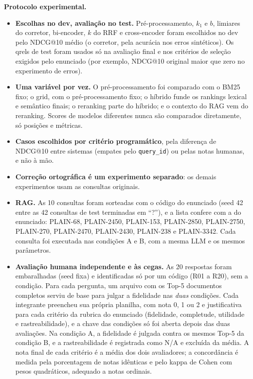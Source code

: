 \documentclass[10pt,a4paper]{article}
\newcommand{\pq}[1]{\mbox{PLAIN-#1}}        %
\begin{document}
\textbf{Protocolo experimental.}
\begin{itemize}
\item \textbf{Escolhas no dev, avaliação no test.} Pré-processamento, $k_1$ e $b$, limiares do corretor, bi-encoder, $k$ do RRF e cross-encoder foram escolhidos no dev pelo NDCG@10 médio (o corretor, pela acurácia nos erros sintéticos). Os qrels de test foram usados só na avaliação final e nos critérios de seleção exigidos pelo enunciado (por exemplo, NDCG@10 original maior que zero no experimento de erros).
\item \textbf{Uma variável por vez.} O pré-processamento foi comparado com o BM25 fixo; o grid, com o pré-processamento fixo; o híbrido funde os rankings lexical e semântico finais; o reranking parte do híbrido; e o contexto do RAG vem do reranking. Scores de modelos diferentes nunca são comparados diretamente, só posições e métricas.
\item \textbf{Casos escolhidos por critério programático}, pela diferença de NDCG@10 entre sistemas (empates pelo \texttt{query\_id}) ou pelas notas humanas, e não à mão.
\item \textbf{Correção ortográfica é um experimento separado}: os demais experimentos usam as consultas originais.
\item \textbf{RAG.} As 10 consultas foram sorteadas com o código do enunciado (seed 42 entre as 42 consultas de test terminadas em ``?''), e a lista confere com a do enunciado: \pq{68}, \pq{2450}, \pq{153}, \pq{2850}, \pq{2750}, \pq{270}, \pq{2470}, \pq{2430}, \pq{238} e \pq{3342}. Cada consulta foi executada nas condições A e B, com a mesma LLM e os mesmos parâmetros.
\item \textbf{Avaliação humana independente e às cegas.} As 20 respostas foram embaralhadas (seed fixa) e identificadas só por um código (R01 a R20), sem a condição. Para cada pergunta, um arquivo com os Top-5 documentos completos serviu de base para julgar a fidelidade nas \emph{duas} condições. Cada integrante preencheu sua própria planilha, com nota 0, 1 ou 2 e justificativa para cada critério da rubrica do enunciado (fidelidade, completude, utilidade e rastreabilidade), e a chave das condições só foi aberta depois das duas avaliações. Na condição A, a fidelidade é julgada contra os mesmos Top-5 da condição B, e a rastreabilidade é registrada como N/A e excluída da média. A nota final de cada critério é a média dos dois avaliadores; a concordância é medida pela porcentagem de notas idênticas e pelo kappa de Cohen com pesos quadráticos, adequado a notas ordinais.

\end{itemize}
\end{document}

